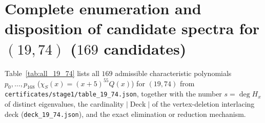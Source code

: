 \documentclass[11pt,reqno]{amsart}
\theoremstyle{definition}
\theoremstyle{remark}
\numberwithin{equation}{section}
\numberwithin{table}{section}
\DeclareMathOperator{\Deck}{Deck}
\begin{document}
\appendix

\section{Complete enumeration and disposition of candidate spectra for \texorpdfstring{$(19, 74)$}{(19, 74)} (\texorpdfstring{$169$}{169} candidates)}\label{app:census_19_74}

Table~\ref{tab:all_19_74} lists all $169$ admissible characteristic polynomials $p_0, \dots, p_{168}$ ($\chi_S(x) = (x + 5)^{55} Q(x)$) for $(19, 74)$ from \nolinkurl{certificates/stage1/table_19_74.json}, together with the number $s = \deg H_x$ of distinct eigenvalues, the cardinality $|\Deck|$ of the vertex-deletion interlacing deck (\nolinkurl{deck_19_74.json}), and the exact elimination or reduction mechanism.
\end{document}
